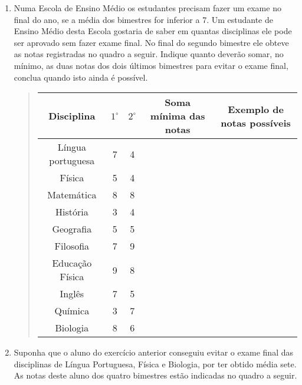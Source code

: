 \exercise

\label{\detokenize{PE104-E:sec-exercicos}}\label{\detokenize{PE104-E::doc}}\label{\detokenize{PE104-E:exercicios}}

\begin{enumerate}
\item Numa Escola de Ensino Médio os estudantes precisam fazer um exame no final do ano, se a média dos bimestres for inferior a 7. Um estudante de Ensino Médio desta Escola gostaria de saber em quantas disciplinas ele pode ser aprovado sem fazer exame final. No final do segundo bimestre ele obteve as notas registradas no quadro a seguir. Indique quanto deverão somar, no mínimo, as duas notas dos dois últimos bimestres para evitar o exame final, conclua quando isto ainda é possível.
\begin{quote}


\begin{savenotes}\sphinxattablestart
\centering
\begin{tabular}[t]{|c|c|c|c|c|}
\hline
Disciplina & $1^\circ$ & $2^\circ$  &  Soma mínima das notas &  Exemplo de notas possíveis\\
\hline
Língua portuguesa & 7 & 4 & &\\
\hline
Física & 5 & 4 & & \\
\hline
Matemática & 8 & 8 &&\\
\hline
História & 3 & 4 && \\
\hline
Geografia
&
5
&
5
&&
\\
\hline
Filosofia
&
7
&
9
&&\\
\hline
Educação Física
&
9
&
8
&&\\
\hline
Inglês
&
7
&
5
&&\\
\hline
Química
&
3
&
7
&&\\
\hline
Biologia
&
8
&
6
&&\\
\hline
\end{tabular}
\par
\sphinxattableend\end{savenotes}
\end{quote}

\item Suponha que o aluno do exercício anterior conseguiu evitar o exame final das disciplinas de Língua Portuguesa, Física e Biologia, por ter obtido média sete. As notas deste aluno dos quatro bimestres estão indicadas no quadro a seguir.
\begin{quote}



\end{quote}
\end{enumerate}
